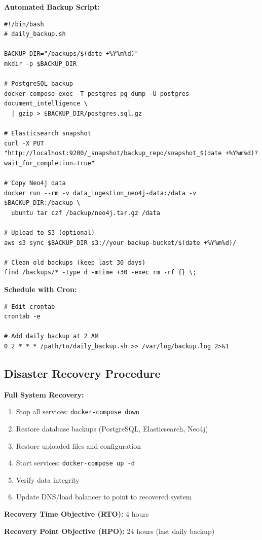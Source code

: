 \textbf{Automated Backup Script:}
\begin{commandbox}
\begin{lstlisting}[style=bashstyle]
#!/bin/bash
# daily_backup.sh

BACKUP_DIR="/backups/$(date +%Y%m%d)"
mkdir -p $BACKUP_DIR

# PostgreSQL backup
docker-compose exec -T postgres pg_dump -U postgres document_intelligence \
  | gzip > $BACKUP_DIR/postgres.sql.gz

# Elasticsearch snapshot
curl -X PUT "http://localhost:9200/_snapshot/backup_repo/snapshot_$(date +%Y%m%d)?wait_for_completion=true"

# Copy Neo4j data
docker run --rm -v data_ingestion_neo4j-data:/data -v $BACKUP_DIR:/backup \
  ubuntu tar czf /backup/neo4j.tar.gz /data

# Upload to S3 (optional)
aws s3 sync $BACKUP_DIR s3://your-backup-bucket/$(date +%Y%m%d)/

# Clean old backups (keep last 30 days)
find /backups/* -type d -mtime +30 -exec rm -rf {} \;
\end{lstlisting}
\end{commandbox}

\textbf{Schedule with Cron:}
\begin{commandbox}
\begin{lstlisting}[style=bashstyle]
# Edit crontab
crontab -e

# Add daily backup at 2 AM
0 2 * * * /path/to/daily_backup.sh >> /var/log/backup.log 2>&1
\end{lstlisting}
\end{commandbox}

\subsection{Disaster Recovery Procedure}

\textbf{Full System Recovery:}
\begin{enumerate}
    \item Stop all services: \texttt{docker-compose down}
    \item Restore database backups (PostgreSQL, Elasticsearch, Neo4j)
    \item Restore uploaded files and configuration
    \item Start services: \texttt{docker-compose up -d}
    \item Verify data integrity
    \item Update DNS/load balancer to point to recovered system
\end{enumerate}

\textbf{Recovery Time Objective (RTO):} 4 hours

\textbf{Recovery Point Objective (RPO):} 24 hours (last daily backup)



